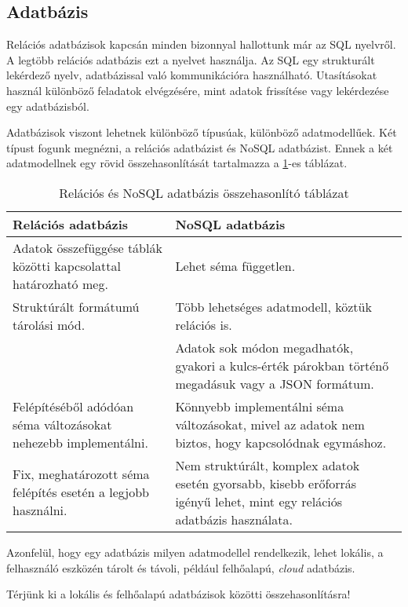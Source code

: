 \newpage
\subsection{Adatbázis}

Relációs adatbázisok kapcsán minden bizonnyal hallottunk már az SQL nyelvről. A legtöbb relációs adatbázis ezt a nyelvet használja. Az SQL egy strukturált lekérdező nyelv, adatbázissal való kommunikációra használható. Utasításokat használ különböző feladatok elvégzésére, mint adatok frissítése vagy lekérdezése egy adatbázisból.

Adatbázisok viszont lehetnek különböző típusúak, különböző adatmodellűek. Két típust fogunk megnézni, a relációs adatbázist és NoSQL adatbázist. Ennek a két adatmodellnek egy rövid összehasonlítását tartalmazza a \ref{tab:rdbmsandnosql}-es táblázat.

\begin{table}[H]
	\centering
	\caption{Relációs és NoSQL adatbázis összehasonlító táblázat}
	\label{tab:rdbmsandnosql}
	\medskip	
	\begin{tabular}{|p{7.2cm}|p{7.2cm}|}
		\hline
		\textbf{Relációs adatbázis} & \textbf{NoSQL adatbázis} \\
		\hline
		Adatok összefüggése táblák közötti kapcsolattal határozható meg. &  Lehet séma független.\\
		Struktúrált formátumú tárolási mód. & Több lehetséges adatmodell, köztük relációs is.\\
		& Adatok sok módon megadhatók, gyakori a kulcs-érték párokban történő megadásuk vagy a JSON formátum.\\
		\hline
		Felépítéséből adódóan séma változásokat nehezebb implementálni. & Könnyebb implementálni séma változásokat, mivel az adatok nem biztos, hogy kapcsolódnak egymáshoz. \\
		\hline
		Fix, meghatározott séma felépítés esetén a legjobb használni. & Nem struktúrált, komplex adatok esetén gyorsabb, kisebb erőforrás igényű lehet, mint egy relációs adatbázis használata.\\
		\hline
	\end{tabular}
\end{table}

\vspace{10pt}
\noindent Azonfelül, hogy egy adatbázis milyen adatmodellel rendelkezik, lehet lokális, a felhasználó eszközén tárolt és távoli, például felhőalapú, \textit{cloud} adatbázis.

Térjünk ki a lokális és felhőalapú adatbázisok közötti összehasonlításra!

